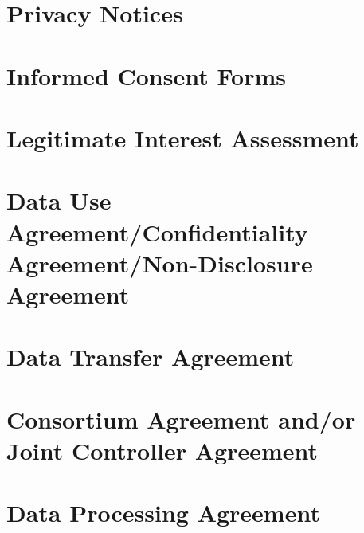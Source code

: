 \documentclass[
]{book}
\begin{document}
\hypertarget{privacy-notices}{%
\section*{Privacy Notices}\label{privacy-notices}}

\hypertarget{informed-consent-forms}{%
\section*{Informed Consent Forms}\label{informed-consent-forms}}

\hypertarget{legitimate-interest-assessment}{%
\section*{Legitimate Interest Assessment}\label{legitimate-interest-assessment}}

\hypertarget{data-use-agreementconfidentiality-agreementnon-disclosure-agreement}{%
\section{Data Use Agreement/Confidentiality Agreement/Non-Disclosure Agreement}\label{data-use-agreementconfidentiality-agreementnon-disclosure-agreement}}

\hypertarget{data-transfer-agreement}{%
\section*{Data Transfer Agreement}\label{data-transfer-agreement}}

\hypertarget{consortium-agreement-andor-joint-controller-agreement}{%
\section{Consortium Agreement and/or Joint Controller Agreement}\label{consortium-agreement-andor-joint-controller-agreement}}

\hypertarget{data-processing-agreement}{%
\section*{Data Processing Agreement}\label{data-processing-agreement}}
\end{document}
